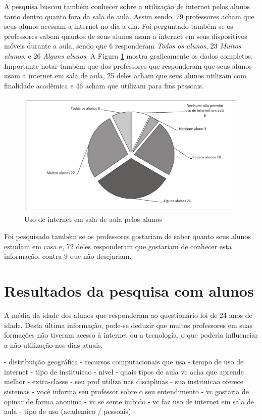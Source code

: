 A pesquisa buscou também conhecer sobre a utilização de internet pelos alunos tanto dentro quanto fora da sala de aula. Assim sendo, 79 professores acham que seus alunos acessam a internet no dia-a-dia. Foi perguntado também se os professores sabem quantos de seus alunos usam a internet em seus dispositivos móveis durante a aula, sendo que 6 responderam \emph{Todos os alunos}, 23 \emph{Muitos alunos}, e 26 \emph{Alguns alunos}. A Figura \ref{fig:grafico_internet_sala} mostra graficamente os dados completos. Importante notar também que dos professores que responderam que seus alunos usam a internet em sala de aula, 25 deles acham que seus alunos utilizam com finalidade acadêmica e 46 acham que utilizam para fins pessoais.

\begin{figure}[!h]
\centering
\includegraphics[width=1.0\textwidth]{pdfs/professores/img-grafico-internet-sala.pdf} 
\caption{Uso de internet em sala de aula pelos alunos}
\label{fig:grafico_internet_sala} 
\end{figure}

Foi pesquisado também se os professores gostariam de saber quanto seus alunos estudam em casa e, 72 deles responderam que gostariam de conhecer esta informação, contra 9 que não desejariam.

\section{Resultados da pesquisa com alunos}

A média da idade dos alunos que responderam ao questionário foi de 24 anos de idade. Desta última informação, pode-se deduzir que muitos professores em suas formações não tiveram acesso à internet ou a tecnologia, o que poderia influenciar a não utilização nos dias atuais.

- distribuição geográfica
- recursos computacionais que usa
- tempo de uso de internet
- tipo de instituicao
- nivel
- quais tipos de aula vc acha que aprende melhor
- extra-classe
- seu prof utiliza nas disciplinas
- sua instituicao oferece sistemas
- você informa seu professor sobre o seu entendimento
- vc gostaria de opinar de forma anonima
- vc se sente inibido
- vc faz uso de internet em sala de aula
- tipo de uso (academico / pessoais)
- 

